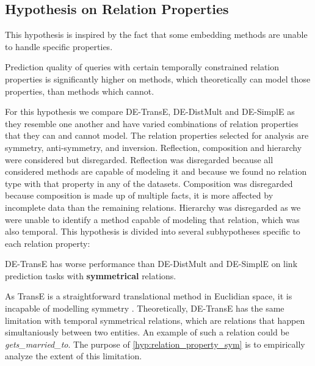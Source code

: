 \subsection{Hypothesis on Relation Properties}
\label{sec:hypothesis_relation_properties}

This hypothesis is inspired by the fact that some embedding methods are unable to handle specific properties.



\begin{hypothesis}
\label{hyp:relation_properties}
Prediction quality of queries with certain temporally constrained relation properties is significantly higher on methods, which theoretically can model those properties, than methods which cannot.
\end{hypothesis}

For this hypothesis we compare DE-TransE, DE-DistMult and DE-SimplE as they resemble one another and have varied combinations of relation properties that they can and cannot model.
The relation properties selected for analysis are symmetry, anti-symmetry, and inversion. Reflection, composition and hierarchy were considered but disregarded. 
Reflection was disregarded because all considered methods are capable of modeling it and because we found no relation type with that property in any of the datasets.
Composition was disregarded because composition is made up of multiple facts, it is more affected by incomplete data than the remaining relations.
Hierarchy was disregarded as we were unable to identify a method capable of modeling that relation, which was also temporal.
This hypothesis is divided into several subhypotheses specific to each relation property:

\begin{subhypothesis}
\label{hyp:relation_property_sym}
DE-TransE has worse performance than DE-DistMult and DE-SimplE on link prediction tasks with \textbf{symmetrical} relations.
\end{subhypothesis}

As TransE is a straightforward translational method in Euclidian space, it is incapable of modelling symmetry \cite{goel19diachronicemb}. Theoretically, DE-TransE has the same limitation with temporal symmetrical relations, which are relations that happen simultaniously between two entities. An example of such a relation could be \textit{gets\_married\_to}. The purpose of \autoref{hyp:relation_property_sym} is to empirically analyze the extent of this limitation.

